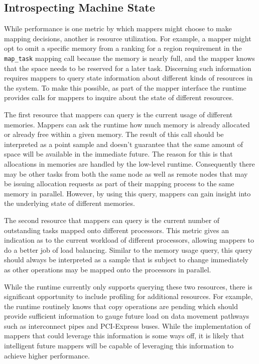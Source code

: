 \subsection{Introspecting Machine State}
\label{subsec:introspection}
While performance is one metric by which mappers might
choose to make mapping decisions, another is resource
utilization. For example, a mapper might opt to 
omit a specific memory from a ranking for a region
requirement in the {\tt map\_task} mapping call because
the memory is nearly full, and the mapper knows that
the space needs to be reserved for a later task.
Discerning such information requires mappers to 
query state information about different kinds of 
resources in the system. To make this possible, as
part of the mapper interface the runtime provides
calls for mappers to inquire about the state of
different resources.

The first resource that mappers can query is the 
current usage of different memories. Mappers can
ask the runtime how much memory is already allocated
or already free within a given memory. The result
of this call should be interpreted as a point sample
and doesn't guarantee that the same amount of space
will be available in the immediate future. The reason
for this is that allocations in memories are handled
by the low-level runtime.  Consequently there may
be other tasks from both the same node as well as 
remote nodes that may be issuing allocation requests
as part of their mapping process to the same memory
in parallel. However, by using this query, mappers
can gain insight into the underlying state of 
different memories.

The second resource that mappers can query is the 
current number of outstanding tasks mapped onto
different processors. This metric gives an 
indication as to the current workload of different
processors, allowing mappers to do a better
job of load balancing. Similar to the memory
usage query, this query should always be interpreted
as a sample that is subject to change immediately
as other operations may be mapped onto the 
processors in parallel.

While the runtime currently only supports querying
these two resources, there is significant opportunity
to include profiling for additional resources. For
example, the runtime routinely knows that copy
operations are pending which should provide sufficient
information to gauge future load on data movement
pathways such as interconnect pipes and PCI-Express
buses. While the implementation of mappers that could
leverage this information is some ways off, it is
likely that intelligent future mappers will be capable
of leveraging this information to achieve higher
performance.

